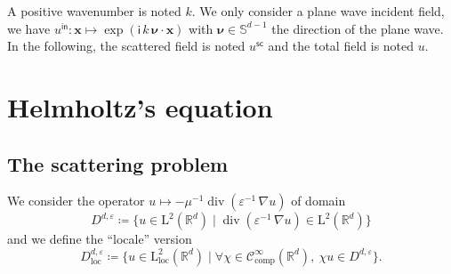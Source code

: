 \documentclass[12pt,a4paper]{article}
\newcommand{\bbR}{\mathbb{R}}
\newcommand{\bbS}{\mathbb{S}}
\newcommand{\scrC}{\mathscr{C}}
\newcommand{\rmL}{\mathrm{L}}
\newcommand{\im}{\mathsf{i}}
\DeclareMathOperator{\Div}{div}
\newcommand{\vect}[1]{\boldsymbol{#1}}
\newcommand{\vx}{\boldsymbol{x}}
\newcommand{\eps}{\varepsilon}
\newcommand{\comp}{\mathrm{comp}}
\newcommand{\loc}{\mathrm{loc}}
\newcommand{\inc}{\mathsf{in}}
\newcommand{\sca}{\mathsf{sc}}
\begin{document}
\bigskip

A positive wavenumber is noted $k$.
We only consider a plane wave incident field, we have $u^\inc : \vx \mapsto \exp(\im\, k\, \vect{\nu} \cdot \vx)$ with $\vect{\nu} \in \bbS^{d-1}$ the direction of the plane wave.
In the following, the scattered field is noted $u^\sca$ and the total field is noted $u$.

\section{Helmholtz's equation}

\subsection{The scattering problem}

We consider the operator $u \mapsto -\mu^{-1}\Div(\eps^{-1}\, \nabla u)$ of domain
\[
    D^{d, \eps} \coloneqq \{u \in \rmL^2(\bbR^d) \mid \Div(\eps^{-1}\, \nabla u) \in \rmL^2(\bbR^d)\}
\]
and we define the ``locale'' version
\[
    D_\loc^{d, \eps} \coloneqq \{u \in \rmL_\loc^2(\bbR^d) \mid \forall \chi \in \scrC_\comp^\infty(\bbR^d),\ \chi u \in D^{d, \eps}\}.
\]

\bigskip
\end{document}
